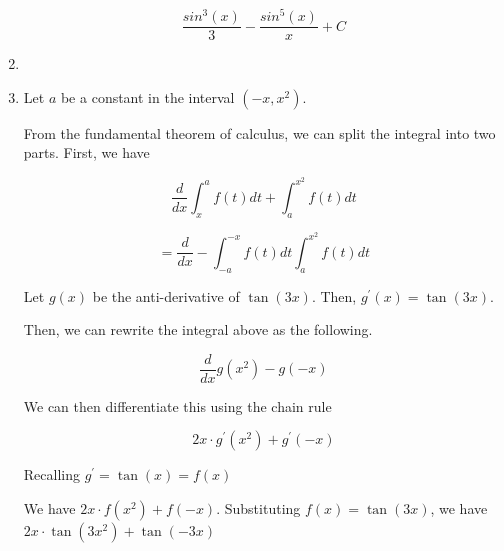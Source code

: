 \documentclass[11pt, letterpaper, twoside]{article}
\begin{document}
\begin{enumerate}
\[\frac{sin^3(x)}{3}-\frac{sin^5(x)}{x}+C\]

\item %


\item %
Let \(a\) be a constant in the interval \((-x, x^2)\).

From the fundamental theorem of calculus, we can split the integral into two parts. 
First, we have 

\[\frac{d}{dx}\int_x^a f(t)dt+\int_a^{x^2}f(t)dt\]

\[=\frac{d}{dx}-\int_{-a}^{-x}f(t)dt\int_a^{x^2}f(t)dt\]

Let \(g(x)\) be the anti-derivative of \(\tan(3x)\). Then, \(g^\prime(x)=\tan(3x)\).

Then, we can rewrite the integral above as the following.

\[\frac{d}{dx}g(x^2)-g(-x)\]

We can then differentiate this using the chain rule

\[2x\cdot g^\prime(x^2)+g^\prime (-x)\]

Recalling \(g^\prime=\tan (x) = f(x)\)

We have \(2x\cdot f(x^2)+f(-x)\). 
Substituting \(f(x)=\tan(3x)\), we have \(\boxed{2x\cdot\tan(3x^2)+\tan(-3x)}\)

\end{enumerate}
\end{document}
